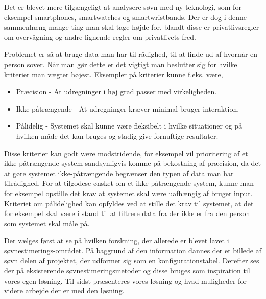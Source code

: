 Det er blevet mere tilgængeligt at analysere søvn med ny teknologi, som for eksempel smartphones, smartwatches og smartwristbands.
Der er dog i denne sammenhæng mange ting man skal tage højde for, blandt disse er privatlivsregler om overvågning og andre lignende regler om privatlivets fred.

Problemet er så at bruge data man har til rådighed, til at finde ud af hvornår en person sover.
Når man gør dette er det vigtigt man beslutter sig for hvilke kriterier man vægter højest.
Eksempler på kriterier kunne f.eks. være,

\begin{itemize}
	\item Præcision - At udregninger i høj grad passer med virkeligheden.
	\item Ikke-påtrængende - At udregninger kræver minimal bruger interaktion.
	\item Pålidelig - Systemet skal kunne være fleksibelt i hvilke situationer og på hvilken måde det kan bruges og stadig give fornuftige resultater.
\end{itemize}

Disse kriterier kan godt være modstridende, for eksempel vil prioritering af et ikke-påtrængende system sandsynligvis komme på bekostning af præcision, da det at gøre systemet ikke-påtrængende begrænser den typen af data man har tilrådighed.
For at tilgodese ønsket om et ikke-påtrængende system, kunne man for eksempel opstille det krav at systemet skal være uafhængig af bruger input.
Kriteriet om pålidelighed kan opfyldes ved at stille det krav til systemet, at det for eksempel skal være i stand til at filtrere data fra der ikke er fra den person som systemet skal måle på.

Der vælges først at se på hvilken forskning, der allerede er blevet lavet i søvnestimerings-området.
På baggrund af den information dannes der et billede af søvn delen af projektet, der udformer sig som en konfigurationstabel.
Derefter ses der på eksisterende søvnestimeringsmetoder og disse bruges som inspiration til vores egen løsning.
Til sidst præsenteres vores løsning og hvad muligheder for videre arbejde der er med den løsning. 
